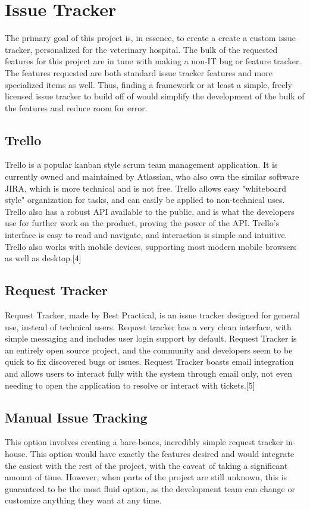 \documentclass[onecolumn, draftclsnofoot,10pt, compsoc]{IEEEtran}
\begin{document}

\section{Issue Tracker}
The primary goal of this project is, in essence, to create a create a custom issue tracker, personalized for the veterinary hospital. The bulk of the requested features
for this project are in tune with making a non-IT bug or feature tracker. The features requested are both standard issue tracker features and more specialized items as 
well. Thus, finding a framework or at least a simple, freely licensed issue tracker to build off of would simplify the development of the bulk of the features and reduce
room for error.
\subsection{Trello}
Trello is a popular kanban style scrum team management application. It is currently owned and maintained by Atlassian, who also own the similar software JIRA, which is more 
technical and is not free. Trello allows easy "whiteboard style" organization for tasks, and can easily be applied to non-technical uses. Trello also has a robust API available 
to the public, and is what the developers use for further work on the product, proving the power of the API. Trello's interface is easy to read and navigate, and interaction
is simple and intuitive. Trello also works with mobile devices, supporting most modern mobile browsers as well as desktop.[4]
\subsection{Request Tracker}
Request Tracker, made by Best Practical, is an issue tracker designed for general use, instead of technical users. Request tracker has a very clean interface, with simple messaging
and includes user login support by default. Request Tracker is an entirely open source project, and the community and developers seem to be quick to fix discovered bugs or issues. 
Request Tracker boasts email integration and allows users to interact fully with the system through email only, not even needing to open the application to resolve or interact with
tickets.[5]
\subsection{Manual Issue Tracking}
This option involves creating a bare-bones, incredibly simple request tracker in-house. This option would have exactly the features desired and would integrate the easiest with the 
rest of the project, with the caveat of taking a significant amount of time. However, when parts of the project are still unknown, this is guaranteed to be the most fluid option, 
as the development team can change or customize anything they want at any time. 
\end{document}
